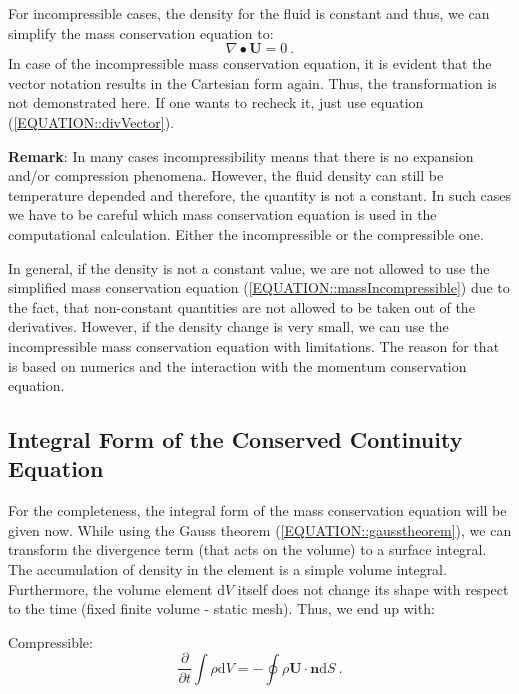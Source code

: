 \documentclass[MathematicsNumericsDerivationsAndOpenFOAM.tex]{subfiles}
\begin{document}
	For incompressible cases, the density for the fluid is constant and thus,
    we can simplify the mass conservation equation to:
%
%
\begin{equation}
 \boxed{  \nabla \bullet \textbf{U} = 0} ~.
 \label{EQUATION::massIncompressible}
\end{equation}
%
%
	In case of the incompressible mass conservation equation, it is evident
    that the vector notation results in the Cartesian form again. Thus,
    the transformation is not demonstrated here. If one wants to recheck it,
    just use equation (\ref{EQUATION::divVector}).

	\textbf{Remark}: In many cases incompressibility means that there is no
    expansion and/or compression phenomena. However, the fluid density can
    still be temperature depended and therefore, the quantity is not a
    constant. In such cases we have to be careful which mass conservation
    equation is used in the computational calculation. Either the
    incompressible or the compressible one.

	In general, if the density is not a constant value, we are not allowed to
    use the simplified mass conservation equation
    (\ref{EQUATION::massIncompressible}) due to the fact, that non-constant
    quantities are not allowed to be taken out of the derivatives. However,
    if the density change is very small, we can use the incompressible mass
    conservation equation with limitations. The reason for that is based
    on numerics and the interaction with the momentum conservation equation.

%
%
\subsection{Integral Form of the Conserved Continuity Equation}
%
%
	For the completeness, the integral form of the mass conservation equation
    will be given now. While using the Gauss theorem
    (\ref{EQUATION::gausstheorem}), we can transform the divergence term
    (that acts on the volume) to a surface integral. The accumulation of
    density in the element is a simple volume integral. Furthermore, the
    volume element d$V$ itself does not change its shape with respect to
    the time (fixed finite volume - static mesh). Thus, we end up with:
%
%

	Compressible:
%
%
\begin{equation}
 \boxed{
 \frac{\partial}{\partial t} \int \rho \mathrm{d}V=
 -   \oint \rho \textbf{U} \cdot \textbf{n} \mathrm{d}S
   } ~.
\end{equation}
%
%
\end{document}
